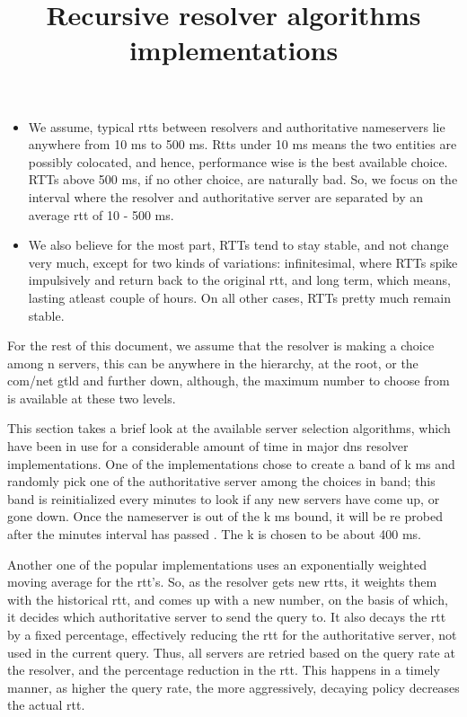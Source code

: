 \documentclass{article} 
\begin{document}
\begin{itemize}
\item We assume, typical rtts between resolvers and authoritative
  nameservers lie anywhere from 10 ms to 500 ms. Rtts under 10 ms
  means the two entities are possibly colocated, and hence,
  performance wise is the best available choice. RTTs above 500 ms, if
  no other choice, are naturally bad. So, we focus on the interval
  where the resolver and authoritative server are separated by an
  average rtt of 10 - 500 ms.

\item We also believe for the most part, RTTs tend to stay stable, and
  not change very much, except for two kinds of variations:
  infinitesimal, where RTTs spike impulsively and return back to the
  original rtt, and long term, which means, lasting atleast couple of
  hours. On all other cases, RTTs pretty much remain stable.

\end{itemize}

For the rest of this document, we assume that the resolver is making
a choice among n servers, this can be anywhere in the hierarchy, 
at the root, or the com/net gtld and further down, although, the maximum
number to choose from is available at these two levels.


\title{Recursive resolver algorithms implementations} This section
takes a brief look at the available server selection algorithms, which
have been in use for a considerable amount of time in major dns
resolver implementations.  One of the implementations chose to create
a band of k ms and randomly pick one of the authoritative server among
the choices in band; this band is reinitialized every \delta minutes
to look if any new servers have come up, or gone down. Once the
nameserver is out of the k ms bound, it will be re probed after the
\delta minutes interval has passed .  The k is chosen to be about 400
ms.

Another one of the popular implementations uses an exponentially
weighted moving average for the rtt's. So, as the resolver gets new
rtts, it weights them with the historical rtt, and comes up with a new
number, on the basis of which, it decides which authoritative server
to send the query to. It also decays the rtt by a fixed percentage,
effectively reducing the rtt for the authoritative server, not used in
the current query. Thus, all servers are retried based on the query
rate at the resolver, and the percentage reduction in the rtt.  This
happens in a timely manner, as higher the query rate, the more
aggressively, decaying policy decreases the actual rtt.
\end{document}
